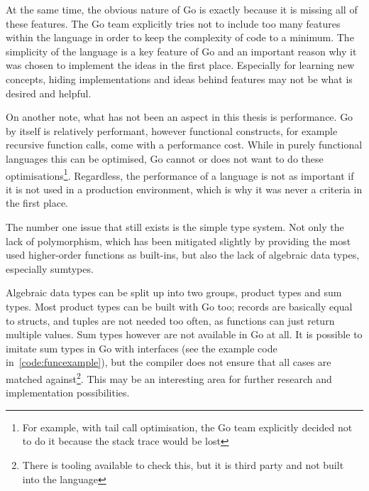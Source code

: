 At the same time, the obvious nature of Go is exactly because it is missing all
of these features. The Go team explicitly tries not to include too many features within
the language in order to keep the complexity of code to a minimum\autocite{go-feature}.
The simplicity of the language is a key feature of Go and an important reason why it was
chosen to implement the ideas in the first place.
Especially for learning new concepts, hiding implementations and ideas behind features
may not be what is desired and helpful.

On another note, what has not been an aspect in this thesis is
performance. Go by itself is relatively performant, however functional constructs, for example
recursive function calls, come with a performance cost. While in purely functional languages
this can be optimised, Go cannot or does not want to do these optimisations\footnote{For example,
with tail call optimisation, the Go team explicitly decided not to do it because the stack trace
would be lost}. Regardless, the performance of a language is not as important if it
is not used in a production environment, which is why it was never a criteria in the first place.


The number one issue that still exists is the simple type system. Not only the lack of polymorphism, which
has been mitigated slightly by providing the most used higher-order functions as built-ins, but also the
lack of algebraic data types, especially \gls{sumtypes}.

Algebraic data types can be split up into two groups, product types and sum types.
Most product types can be built with Go too; records are basically
equal to structs, and tuples are not needed too often, as functions can just return multiple values.
Sum types however are not available in Go at all. It is possible to imitate sum types in Go
with interfaces (see the example code in~\ref{code:funcexample}), but the compiler does not ensure that
all cases are matched against\footnote{There is tooling available to check this\autocite{sushi-sumtypes},
	but it is third party and not built into the language}. This may be an interesting area for further
research and implementation possibilities.
